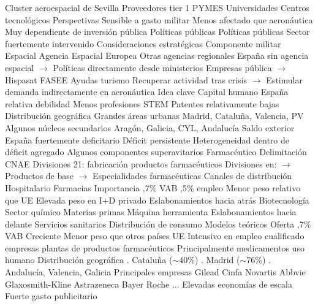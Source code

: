 \documentclass{nuevotema}
\begin{document}
\begin{esquemal}
				\4 Cluster aeroespacial de Sevilla
				\4[] Proveedores tier 1
				\4[] PYMES
				\4[] Universidades
				\4[] Centros tecnológicos
				\4 Perspectivas
				\4[] Sensible a gasto militar
				\4[] Menos afectado que aeronáutica
				\4[] Muy dependiente de inversión pública
				\4 Políticas públicas
			\3 Políticas públicas
				\4 Sector fuertemente intervenido
				\4[] Consideraciones estratégicas
				\4[] Componente militar
				\4 Espacial
				\4[] Agencia Espacial Europea
				\4[] Otras agencias regionales
				\4[] España sin agencia espacial
				\4[] $\to$ Políticas directamente desde ministerios
				\4[] Empresas pública
				\4[] $\to$ Hispasat
				\4 FASEE
				\4 Ayudas turismo
				\4[] Recuperar actividad tras crisis
				\4[] $\to$ Estimular demanda indirectamente en aeronáutica
	\1 
		\2 Idea clave
			\3 Capital humano
				\4 España relativa debilidad
				\4 Menos profesiones STEM
				\4 Patentes relativamente bajas
			\3 Distribución geográfica
				\4 Grandes áreas urbanas
				\4 Madrid, Cataluña, Valencia, PV
				\4 Algunos núcleos secundarios
				\4[] Aragón, Galicia, CYL, Andalucía
			\3 Saldo exterior
				\4 España fuertemente deficitario
				\4 Déficit persistente
				\4 Heterogeneidad dentro de déficit agregado
				\4[] Algunos componentes superavitarios
		\2 Farmacéutico
			\3 Delimitación
				\4 CNAE Divisiones 21: fabricación productos farmacéuticos
				\4 Divisiones en:
				\4[] $\to$ Productos de base
				\4[] $\to$ Especialidades farmacéuticas
				\4 Canales de distribución
				\4[] Hospitalario
				\4[] Farmacias
			\3 Importancia
				\4 0,7\% VAB
				,5\% empleo
				\4 Menor peso relativo que UE
				\4 Elevada peso en I+D privado
				\4 Eslabonamientos hacia atrás
				\4[] Biotecnología
				\4[] Sector químico
				\4[] Materias primas
				\4[] Máquina herramienta
				\4 Eslabonamientos hacia delante
				\4[] Servicios sanitarios
				\4[] Distribución de consumo
			\3 Modelos teóricos
			\3 Oferta
				,7\% VAB
				\4[] Creciente
				\4 Menor peso que otros países UE
				\4 Intensivo en empleo cualificado
				 empresas
				 plantas de productos farmacéuticos
				\4 Principalmente medicamentos uso humano
				\4 Distribución geográfica
				. Cataluña ($\sim 40\%$)
				. Madrid ($\sim 76\%$)
				. Andalucía, Valencia, Galicia
				\4 Principales empresas
				\4[] Gilead
				\4[] Cinfa
				\4[] Novartis
				\4[] Abbvie
				\4[] Glaxosmith-Kline
				\4[] Astrazeneca
				\4[] Bayer
				\4[] Roche
				\4[] ...
				\4 Elevadas economías de escala
				\4 Fuerte gasto publicitario

\end{esquemal}
\end{document}
